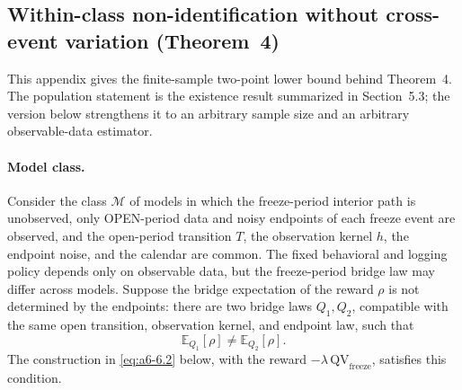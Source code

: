 %
%

\newtheorem*{aVIthm}{Theorem 4}

\providecommand{\theHequation}{}
\let\aVItheHequation\theHequation
{}
\renewcommand{\theHequation}{aVI.\arabic{aVIanchor}}
\newcommand{\aVIfixedtag}[1]{\stepcounter{aVIanchor}\tag{#1}}

\subsection{Within-class non-identification without cross-event variation (Theorem~4)}\label{app:a6}

This appendix gives the finite-sample two-point lower bound behind
Theorem~4.  The population statement is the existence result summarized
in Section~5.3; the version below strengthens it to an arbitrary sample
size and an arbitrary observable-data estimator.

\paragraph{Model class.}
Consider the class $\mathcal M$ of models in which the freeze-period
interior path is unobserved, only OPEN-period data and noisy endpoints
of each freeze event are observed, and the open-period transition $T$,
the observation kernel $h$, the endpoint noise, and the calendar are
common.  The fixed behavioral and logging policy depends only on
observable data, but the freeze-period bridge law may differ across
models.  Suppose the bridge expectation of the reward $\rho$ is not
determined by the endpoints: there are two bridge laws $Q_1,Q_2$,
compatible with the same open transition, observation kernel, and
endpoint law, such that
\[
\mathbb E_{Q_1}[\rho]\ne\mathbb E_{Q_2}[\rho].
\]
The construction in \eqref{eq:a6-6.2} below, with the reward
$-\lambda\,\mathrm{QV}_{\mathrm{freeze}}$, satisfies this condition.

